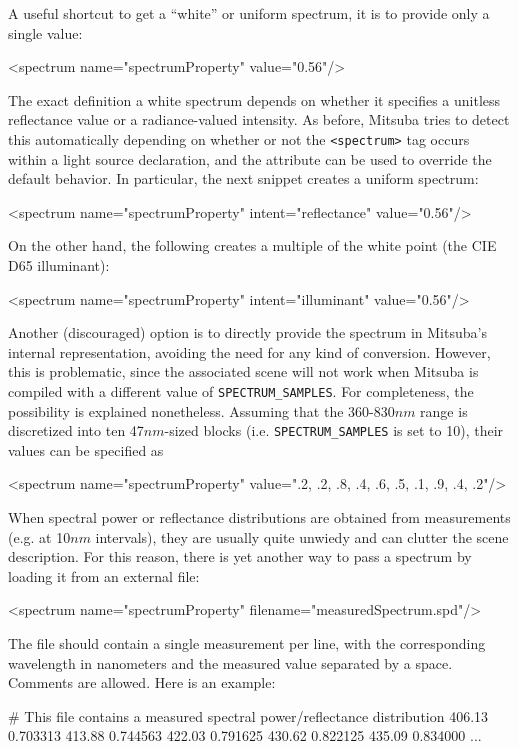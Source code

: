 A useful shortcut to get a ``white'' or uniform spectrum, it is to provide
only a single value:
\begin{xml}
<spectrum name="spectrumProperty" value="0.56"/>
\end{xml}
The exact definition a white spectrum depends on whether
it specifies a unitless reflectance value or a radiance-valued intensity. As before,
Mitsuba tries to detect this automatically depending on whether or not the \texttt{<spectrum>}
tag occurs within a light source declaration, and the  attribute can be used
to override the default behavior. In particular, the next snippet creates a uniform spectrum:
\begin{xml}
<spectrum name="spectrumProperty" intent="reflectance" value="0.56"/>
\end{xml}
On the other hand, the following creates a multiple of the white point (the CIE D65 illuminant):
\begin{xml}
<spectrum name="spectrumProperty" intent="illuminant" value="0.56"/>
\end{xml}


Another (discouraged) option is to directly provide the spectrum in Mitsuba's
internal representation, avoiding the need for any kind of conversion.
However, this is problematic, since the associated scene will not work
when Mitsuba is compiled with a different value of
\texttt{SPECTRUM\_SAMPLES}.
For completeness, the possibility is explained nonetheless. Assuming that
the 360-830$nm$ range is discretized into ten 47$nm$-sized blocks
(i.e. \texttt{SPECTRUM\_SAMPLES} is set to 10), their values can be specified
as
\begin{xml}
<spectrum name="spectrumProperty" value=".2, .2, .8, .4, .6, .5, .1, .9, .4, .2"/>
\end{xml}


When spectral power or reflectance distributions are obtained from measurements
(e.g. at 10$nm$ intervals), they are usually quite unwiedy and can clutter
the scene description. For this reason, there is yet another way to pass
a spectrum by loading it from an external file:
\begin{xml}
<spectrum name="spectrumProperty" filename="measuredSpectrum.spd"/>
\end{xml}
The file should contain a single measurement per line, with the corresponding
wavelength in nanometers and the measured value separated by a space. Comments
are allowed. Here is an example:
\begin{xml}
# This file contains a measured spectral power/reflectance distribution
406.13 0.703313
413.88 0.744563
422.03 0.791625
430.62 0.822125
435.09 0.834000
...
\end{xml}

